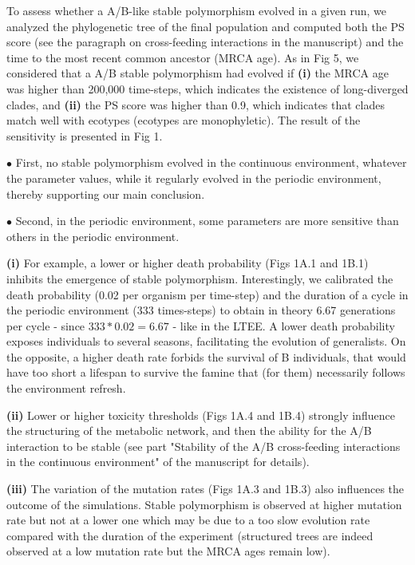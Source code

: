 To assess whether a A/B-like stable polymorphism evolved in a given run, we analyzed the phylogenetic tree of the final population and computed both the PS score (see the paragraph on cross-feeding interactions in the manuscript) and the time to the most recent common ancestor (MRCA age). As in Fig 5, we considered that a A/B stable polymorphism had evolved if \textbf{(i)} the MRCA age was higher than 200,000 time-steps, which indicates the existence of long-diverged clades, and \textbf{(ii)} the PS score was higher than 0.9, which indicates that clades match well with ecotypes (ecotypes are monophyletic). The result of the sensitivity is presented in Fig 1.

$\bullet$ First, no stable polymorphism evolved in the continuous environment, whatever the parameter values, while it regularly evolved in the periodic environment, thereby supporting our main conclusion.

$\bullet$ Second, in the periodic environment, some parameters are more sensitive than others in the periodic environment.

\textbf{(i)} For example, a lower or higher death probability (Figs 1A.1 and 1B.1) inhibits the emergence of stable polymorphism. Interestingly, we calibrated the death probability (0.02 per organism per time-step) and the duration of a cycle in the periodic environment (333 times-steps) to obtain in theory 6.67 generations per cycle - since $333*0.02=6.67$ - like in the LTEE. A lower death probability exposes individuals to several seasons, facilitating the evolution of generalists. On the opposite, a higher death rate forbids the survival of B individuals, that would have too short a lifespan to survive the famine that (for them) necessarily follows the environment refresh.

\textbf{(ii)} Lower or higher toxicity thresholds (Figs 1A.4 and 1B.4) strongly influence the structuring of the metabolic network, and then the ability for the A/B interaction to be stable (see part "Stability of the A/B cross-feeding interactions in the continuous environment" of the manuscript for details).

\textbf{(iii)} The variation of the mutation rates (Figs 1A.3 and 1B.3) also influences the outcome of the simulations. Stable polymorphism is observed at higher mutation rate but not at a lower one which may be due to a too slow evolution rate compared with the duration of the experiment (structured trees are indeed observed at a low mutation rate but the MRCA ages remain low). 

